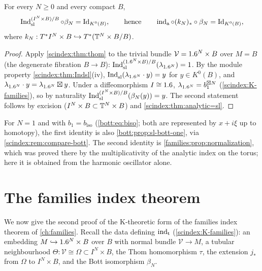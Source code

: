 \begin{corollary}\label{scindex:cor:normalization}
  For every $N\ge0$ and every compact $B$,
  \begin{equation*}
    \operatorname{Ind}^{(I^N\times B)/B}_{\mathrm{sl}}\circ\beta_N=\operatorname{Id}_{K^0(B)},\qquad\text{hence}\qquad
    \operatorname{ind}_{\mathrm{a}}\circ(k_N)_*\circ\beta_N=\operatorname{Id}_{K^0(B)},
  \end{equation*}
  where $k_N:T^*I^N\times B\hookrightarrow T^*(\mathbb{T}^N\times B/B)$.
\end{corollary}
\begin{proof}
  Apply \cref{scindex:thm:thom} to the trivial bundle $\mathcal V=1.6^N\times B$
  over $M=B$ (the degenerate fibration $B\to B$): $\operatorname{Ind}^{(1.6^N\times B)/B}_{\mathrm{sl}}
  (\lambda_{1.6^N})=1$. By the module property \cref{scindex:thm:Indsl}(iv),
  $\operatorname{Ind}^{}_{\mathrm{sl}}(\lambda_{1.6^N}\cdot y)=y$ for $y\in K^0(B)$, and $\lambda_{1.6^N}\cdot y=
  \lambda_{1.6^N}\boxtimes y$. Under a diffeomorphism $I\cong1.6$,
  $\lambda_{1.6^N}=b_1^{\boxtimes N}$ (\ref{scindex:K-families}), so by naturality
  $\operatorname{Ind}^{(I^N\times B)/B}_{\mathrm{sl}}(\beta_N(y))=y$. The second statement follows by
  excision ($I^N\times B\subset\mathbb{T}^N\times B$) and
  \cref{scindex:thm:analytic=sl}.
\end{proof}
For $N=1$ and with $b_1=b_{\mathrm{iso}}$ (\eqref{bott:eq:biso}; both are
represented by $x+i\xi$ up to homotopy), the first identity is also
\cref{bott:prop:sl-bott-one}, via \cref{scindex:rem:compare-bott}.
The second identity is \cref{families:prop:normalization}, which
was proved there by the multiplicativity of the analytic index on the torus; here
it is obtained from the harmonic oscillator alone.

\section{The families index theorem}\label{scindex:sec:AS}

We now give the second proof of the K-theoretic form of the families index
theorem of \cref{ch:families}. Recall the data defining $\operatorname{ind}_{\mathrm{t}}$
(\ref{scindex:K-families}): an embedding $M\hookrightarrow1.6^N\times B$ over
$B$ with normal bundle $\mathcal V\to M$, a tubular neighbourhood
$\Theta:\mathcal V\cong\Omega\subset I^N\times B$, the Thom homomorphism $\tau$,
the extension $j_*$ from $\Omega$ to $I^N\times B$, and the Bott isomorphism
$\beta_N$.

